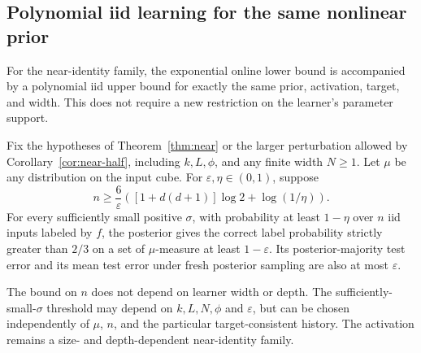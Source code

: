 \subsection{Polynomial iid learning for the same nonlinear prior}
\label{sec:near-iid}

For the near-identity family, the exponential online lower bound is
accompanied by a polynomial iid upper bound for exactly the same prior,
activation, target, and width. This does not require a new restriction
on the learner's parameter support.

\begin{corollary}
\label{cor:iid}
Fix the hypotheses of Theorem~\ref{thm:near} or the larger perturbation
allowed by Corollary~\ref{cor:near-half}, including $k,L,\phi$, and
any finite width $N\ge1$. Let $\mu$ be any distribution on the input
cube. For $\varepsilon,\eta\in(0,1)$, suppose
\begin{equation}\label{eq:iid-sample}
 n\ge\frac6\varepsilon
       \left([1+d(d+1)]\log2+\log(1/\eta)\right).
\end{equation}
For every sufficiently small positive $\sigma$, with probability at least
$1-\eta$ over $n$ iid inputs labeled by $f$, the posterior gives the
correct label probability strictly greater than $2/3$ on a set of
$\mu$-measure at least $1-\varepsilon$. Its posterior-majority test
error and its mean test error under fresh posterior sampling are also
at most $\varepsilon$.

The bound on $n$ does not depend on learner width or depth. The
sufficiently-small-$\sigma$ threshold may depend on $k,L,N,\phi$ and
$\varepsilon$, but can be chosen independently of $\mu$, $n$, and the
particular target-consistent history. The activation remains a
size- and depth-dependent near-identity family.
\end{corollary}
